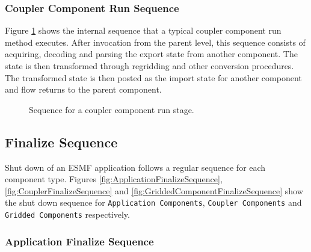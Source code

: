 \subsubsection{Coupler Component Run Sequence}
Figure \ref{fig:CouplerComponentsRunSequence} shows the internal sequence
that a typical coupler component run method executes. After invocation
from the parent level, this sequence consists
of acquiring, decoding and parsing the export state from another component.
The state is then transformed through regridding and other conversion
procedures. The transformed state is then posted as the import state
for another component and flow returns to the parent component.
\begin{figure}
\caption[{Coupler Component Run Sequence}]{Sequence for a coupler component
run stage.\\}
\begin{center}
\label{fig:CouplerComponentsRunSequence}
\end{center}
\end{figure}

\subsection{Finalize Sequence}
Shut down of an ESMF application follows a regular sequence for each component
type. Figures 
\ref{fig:ApplicationFinalizeSequence}, 
\ref{fig:CouplerFinalizeSequence} and 
\ref{fig:GriddedComponentFinalizeSequence} show the shut down sequence for 
{\tt Application Components}, {\tt Coupler Components} and {\tt Gridded Components} respectively.
\subsubsection{Application Finalize Sequence}

